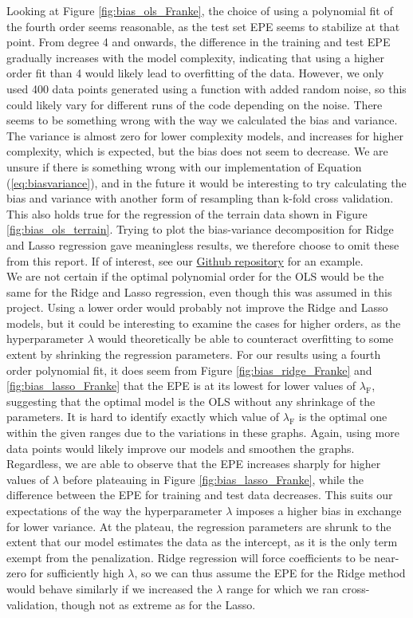 \documentclass[a4paper, 10pt]{article}
\begin{document}
\begin{multicols}{2}
Looking at Figure \ref{fig:bias_ols_Franke}, the choice of using a polynomial fit of the fourth order seems reasonable, as the test set EPE seems to stabilize at that point. From degree 4 and onwards, the difference in the training and test EPE gradually increases with  the model complexity, indicating that using a higher order fit than 4 would likely lead to overfitting of the data. However, we only used 400 data points generated using a function with added random noise, so this could likely vary for different runs of the code depending on the noise. There seems to be something wrong with the way we calculated the bias and variance. The variance is almost zero for lower complexity models, and increases for higher complexity, which is expected, but the bias does not seem to decrease. We are unsure if there is something wrong with our implementation of Equation (\ref{eq:biasvariance}), and in the future it would be interesting to try calculating the bias and variance with another form of resampling than k-fold cross validation. This also holds true for the regression of the terrain data shown in Figure \ref{fig:bias_ols_terrain}. Trying to plot the bias-variance decomposition for Ridge and Lasso regression gave meaningless results, we therefore choose to omit these from this report. If of interest, see our \href{https://github.com/bernharl/FYS-STK4155-project1}{Github repository} for an example.
\\ We are not certain if the optimal polynomial order for the OLS would be the same for the Ridge and Lasso regression, even though this was assumed in this project. Using a lower order would probably not improve the Ridge and Lasso models, but it could be interesting to examine the cases for higher orders, as the hyperparameter $\lambda$ would theoretically be able to counteract overfitting to some extent by shrinking the regression parameters.  For our results using a fourth order polynomial fit, it does seem from Figure \ref{fig:bias_ridge_Franke} and \ref{fig:bias_lasso_Franke} that the EPE is at its lowest for lower values of $\lambda_\text{F}$, suggesting that the optimal model is the OLS without any shrinkage of the parameters. It is hard to identify exactly which value of $\lambda_\text{F}$ is the optimal one within the given ranges due to the variations in these graphs. Again, using more data points would likely improve our models and smoothen the graphs.  Regardless, we are able to observe that the EPE increases sharply for higher values of $\lambda$ before plateauing in Figure \ref{fig:bias_lasso_Franke}, while the difference between the EPE for training and test data decreases. This suits our expectations of the way the hyperparameter $\lambda$ imposes a higher bias in exchange for lower variance. At the plateau, the regression parameters are shrunk to the extent that our model estimates the data as the intercept, as it is the only term exempt from the penalization. Ridge regression will force coefficients to be near-zero for sufficiently high $\lambda$, so we can thus assume the EPE for the Ridge method would behave similarly  if we increased the $\lambda$ range for which we ran cross-validation, though not as extreme as for the Lasso.


\end{multicols}
\end{document}
